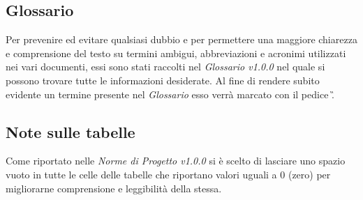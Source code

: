 \subsection{Glossario}
Per prevenire ed evitare qualsiasi dubbio e per permettere una maggiore chiarezza e comprensione del testo su termini ambigui, abbreviazioni e acronimi utilizzati nei vari documenti, essi sono stati raccolti nel \textit{Glossario v1.0.0} nel quale si possono trovare tutte le informazioni desiderate.
Al fine di rendere subito evidente un termine presente nel \textit{Glossario} esso verrà marcato con il pedice \G.

\subsection{Note sulle tabelle}
Come riportato nelle \textit{Norme di Progetto v1.0.0} si è scelto di lasciare uno spazio vuoto in tutte le celle delle tabelle che riportano valori uguali a 0 (zero) per migliorarne comprensione e leggibilità della stessa.

